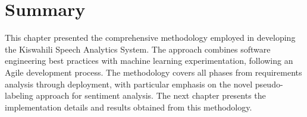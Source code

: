 \documentclass[12pt,a4paper]{report}
\begin{document}
\section{Summary}
This chapter presented the comprehensive methodology employed in developing the Kiswahili Speech Analytics System. The approach combines software engineering best practices with machine learning experimentation, following an Agile development process. The methodology covers all phases from requirements analysis through deployment, with particular emphasis on the novel pseudo-labeling approach for sentiment analysis. The next chapter presents the implementation details and results obtained from this methodology.



\end{document}
